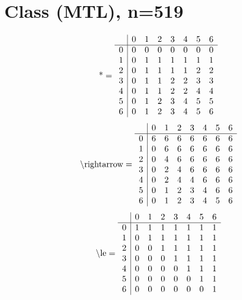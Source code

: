 \documentclass[11pt]{article}
\begin{document}
\section{Class (MTL), n=519}
\[\text{*} = 
\begin{array}{r | r r r r r r r}
 & 0 & 1 & 2 & 3 & 4 & 5 & 6 \\ \hline
0 & 0 & 0 & 0 & 0 & 0 & 0 & 0 \\
1 & 0 & 1 & 1 & 1 & 1 & 1 & 1 \\
2 & 0 & 1 & 1 & 1 & 1 & 2 & 2 \\
3 & 0 & 1 & 1 & 2 & 2 & 3 & 3 \\
4 & 0 & 1 & 1 & 2 & 2 & 4 & 4 \\
5 & 0 & 1 & 2 & 3 & 4 & 5 & 5 \\
6 & 0 & 1 & 2 & 3 & 4 & 5 & 6 \\
\end{array}
\]
\[\text{\textbackslash rightarrow} = 
\begin{array}{r | r r r r r r r}
 & 0 & 1 & 2 & 3 & 4 & 5 & 6 \\ \hline
0 & 6 & 6 & 6 & 6 & 6 & 6 & 6 \\
1 & 0 & 6 & 6 & 6 & 6 & 6 & 6 \\
2 & 0 & 4 & 6 & 6 & 6 & 6 & 6 \\
3 & 0 & 2 & 4 & 6 & 6 & 6 & 6 \\
4 & 0 & 2 & 4 & 4 & 6 & 6 & 6 \\
5 & 0 & 1 & 2 & 3 & 4 & 6 & 6 \\
6 & 0 & 1 & 2 & 3 & 4 & 5 & 6 \\
\end{array}
\]
\[\text{\textbackslash le} = 
\begin{array}{r | r r r r r r r}
 & 0 & 1 & 2 & 3 & 4 & 5 & 6 \\ \hline
0 & 1 & 1 & 1 & 1 & 1 & 1 & 1 \\
1 & 0 & 1 & 1 & 1 & 1 & 1 & 1 \\
2 & 0 & 0 & 1 & 1 & 1 & 1 & 1 \\
3 & 0 & 0 & 0 & 1 & 1 & 1 & 1 \\
4 & 0 & 0 & 0 & 0 & 1 & 1 & 1 \\
5 & 0 & 0 & 0 & 0 & 0 & 1 & 1 \\
6 & 0 & 0 & 0 & 0 & 0 & 0 & 1 \\
\end{array}
\]
\end{document}
